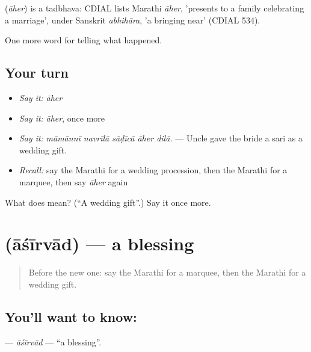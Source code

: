 \begin{cousinweb}
\textbf{} (\emph{āher}) is a tadbhava: CDIAL lists Marathi \emph{āher}, 'presents to a family celebrating a marriage', under Sanskrit \emph{abhihāra}, 'a bringing near' (CDIAL 534).
\end{cousinweb}

\begin{grammarlens}[title={What you've built}]
One more word for telling what happened.
\end{grammarlens}

\subsection*{Your turn}
\begin{itemize}
\raggedright
  \item \emph{Say it:} \emph{āher}
  \item \emph{Say it:} \emph{āher}, once more
  \item \emph{Say it:} \emph{māmānnī navrīlā sāḍīcā āher dilā.} — Uncle gave the bride a sari as a wedding gift.
  \item \emph{Recall:} say the Marathi for a wedding procession, then the Marathi for a marquee, then say \emph{āher} again
\end{itemize}

\begin{tcolorbox}[breakable,colback=teal!4,colframe=teal!35!black,title={Before you move on}]
What does  mean? (\textquotedblleft{}A wedding gift\textquotedblright{}.) Say it once more.
\end{tcolorbox}
\section[\texorpdfstring{\mr{आशीर्वाद} (āśīrvād)}{आशीर्वाद (āśīrvād)}]{ (āśīrvād) — a blessing}

\label{lesson:MR-C317-asirvad}



\begin{quote}
Before the new one: say the Marathi for a marquee, then the Marathi for a wedding gift.
\end{quote}

\subsection*{You'll want to know: }
\textbf{} — \emph{āśīrvād} — \textquotedblleft{}a blessing\textquotedblright{}.

